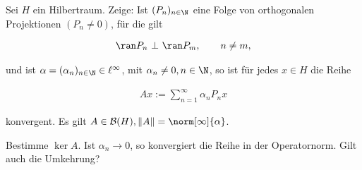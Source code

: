 \begin{exercise}

Sei $H$ ein Hilbertraum.
Zeige:
Ist $(P_n)_{n \in \N}$ eine Folge von orthogonalen Projektionen $(P_n \neq 0)$, für die gilt

\begin{align*}
  \ran P_n ~\bot~ \ran P_m, \qquad n \neq m,
\end{align*}

und ist $\alpha = (\alpha_n)_{n \in \N} \in \ell^{\infty}$, mit $\alpha_n \neq 0, n \in \N$, so ist für jedes $x \in H$ die Reihe

\begin{align*}
  Ax := \sum_{n=1}^{\infty} \alpha_n P_n x
\end{align*}

konvergent.
Es gilt $A \in \mathcal{B}(H), \|A\| = \norm[\infty]{\alpha}$.

Bestimme $\ker A$. Ist $\alpha_n \to 0$, so konvergiert die Reihe in der Operatornorm.
Gilt auch die Umkehrung?

\end{exercise}

